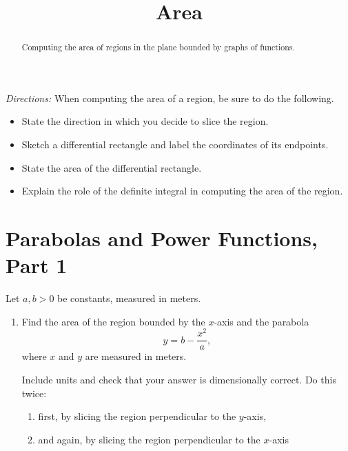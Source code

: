 \documentclass{ximera}
\title{Area}
\begin{document}
\begin{abstract}
Computing the area of regions in the plane bounded by graphs of functions.
\end{abstract}
\maketitle

\emph{Directions:} When computing the area of a region, be sure to do the following.
\begin{itemize}
\item State the direction in which you decide to slice the region.

\item Sketch a differential rectangle and label the coordinates of its endpoints.

\item State the area of the differential rectangle.

\item Explain the role of the definite integral in computing the area of the region. 
\end{itemize}

\section{Parabolas and Power Functions, Part 1}

\begin{question} \label{QWeerFGHG}
Let $a,b>0$ be constants, measured in meters. 

\begin{enumerate}

\item Find the area of the region bounded by the $x$-axis and the parabola
\[
     y  = b - \frac{x^2}{a} ,
\]
where $x$ and $y$ are measured in meters.

Include units and check that your answer is dimensionally correct. Do this twice:

\begin{enumerate}
\item first, by slicing the region perpendicular to the $y$-axis, %

\item and again, by slicing the region perpendicular to the $x$-axis %
\end{enumerate}
\end{enumerate}
\end{question}
\end{document}
